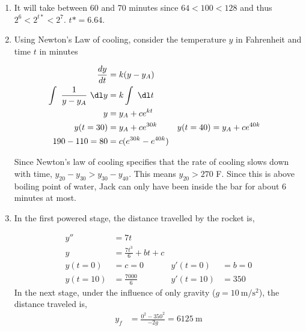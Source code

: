 \begin{enumerate}
    \item It will take between 60 and 70 minutes since $ 64 < 100 < 128 $ and
          thus $ 2^{6} < 2^{t*} < 2^{7} $. $ t* = 6.64$.

    \item Using Newton's Law of cooling, consider the temperature $ y $ in
          Fahrenheit and time $ t $ in minutes

          \begin{align}
              \frac{dy}{dt}                    & = k(y - y_{A})                                         \\
              \int\ \frac{1}{y - y_{A}}\ \dl y & = k \int\ \dl t                                        \\
              y                                & = y_{A} + c e^{kt}                                     \\
              y(t = 30)                        & = y_{A} + ce^{30k}     & y(t = 40) & =y_{A} + ce^{40k} \\
              190 - 110 = 80                   & = c(e^{30k} - e^{40k})
          \end{align}


          Since Newton's law of cooling specifies that the rate of cooling slows down with time,
          $ y_{20} - y_{30} > y_{30} - y_{40}$. This means $ y_{20} > 270$ F. Since this is above
          boiling point of water, Jack can only have been inside the bar for about 6 minutes at
          most.

    \item In the first powered stage, the distance travelled by the rocket is,

          \begin{align}
              y''       & = 7t                                               \\
              y         & = \frac{7t^{3}}{6} + bt + c                        \\
              y(t = 0)  & = c = 0                     & y'(t=0)    & = b = 0 \\
              y(t = 10) & = \frac{7000}{6}            & y'(t = 10) & = 350
          \end{align}
          In the next stage, under the influence of only gravity ($ g = \SI{10}{\meter\per\second\squared} $),
          the distance traveled is,
          \begin{align}
              y_{f} & = \frac{0^{2} - 350^{2}}{-2g} = \SI{6125}{\meter}
          \end{align}



\end{enumerate}
